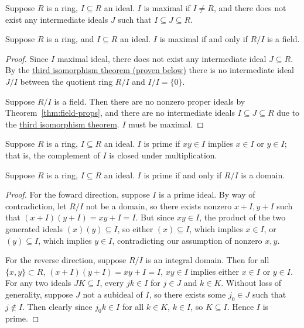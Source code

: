 \begin{definition}
    Suppose \(R\) is a ring, \(I \subseteq R\) an ideal.
    \(I\) is maximal if \(I \neq R\),
    and there does not exist any intermediate ideals \(J\)
    such that \(I \subseteq J \subseteq R\).
\end{definition}
\begin{theorem}\label{thm:maximal-quotient-field}
    Suppose \(R\) is a ring,
    and \(I \subseteq R\) an ideal.
    \(I\) is maximal if and only if \(R/I\) is a field.
\end{theorem}
\begin{proof}
    Since \(I\) maximal ideal,
    there does not exist any intermediate ideal \(J \subseteq R\).
    By the \hyperref[thm:iso-3-ring]{third isomorphism theorem (proven below)}
    there is no intermediate ideal \(J/I\)
    between the quotient ring \(R/I\) and \(I/I = \{0\}\).

    Suppose \(R/I\) is a field.
    Then there are no nonzero proper ideals by Theorem~\ref{thm:field-props},
    and there are no intermediate ideals \(I \subseteq J \subseteq R\)
    due to the \hyperref[thm:iso-3-ring]{third isomorphism theorem}.
    \(I\) must be maximal.
\end{proof}

\begin{definition}
    Suppose \(R\) is a ring, \(I \subseteq R\) an ideal.
    \(I\) is prime if \(xy \in I\) implies \(x \in I\) or \(y \in I\);
    that is, the complement of \(I\) is closed under multiplication.
\end{definition}
\begin{theorem}\label{thm:prime-quotient-domain}
    Suppose \(R\) is a ring, \(I \subseteq R\) an ideal.
    \(I\) is prime if and only if \(R/I\) is a domain.
\end{theorem}
\begin{proof}
    For the foward direction, suppose \(I\) is a prime ideal.
    By way of contradiction, let \(R/I\) not be a domain,
    so there exists nonzero \(x+I, y+I\) such that \((x+I)(y+I) = xy+I = I\).
    But since \(xy \in I\),
    the product of the two generated ideals \((x)(y) \subseteq I\),
    so either \((x) \subseteq I\), which implies \(x \in I\),
    or \((y) \subseteq I\), which implies \(y \in I\),
    contradicting our assumption of nonzero \(x,y\).

    For the reverse direction, suppose \(R/I\) is an integral domain.
    Then for all \(\{x,y\} \subset R\), \((x+I)(y+I) = xy+I = I\),
    \(xy \in I\) implies either \(x \in I\) or \(y \in I\).
    For any two ideals \(JK \subseteq I\),
    every \(jk \in I\) for \(j \in J\) and \(k \in K\).
    Without loss of generality, suppose \(J\) not a subideal of \(I\),
    so there exists some \(j_0 \in J\) such that \(j \notin I\).
    Then clearly since \(j_0 k \in I\) for all \(k \in K\),
    \(k \in I\), so \(K \subseteq I\).
    Hence \(I\) is prime.
\end{proof}

